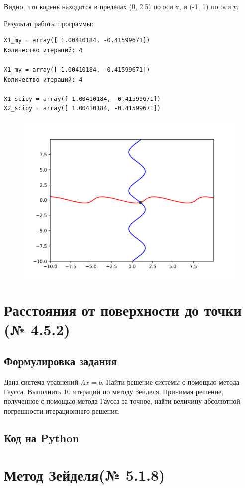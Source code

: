 \documentclass[a4paper,11pt]{article}
\theoremstyle{definition} %
\theoremstyle{remark} %
\begin{document}
Видно, что корень находится в пределах (0, 2.5) по оси x, и (-1, 1)  по оси y.

Результат работы программы:

\begin{verbatim}
X1_my = array([ 1.00410184, -0.41599671])
Количество итераций: 4

X1_my = array([ 1.00410184, -0.41599671])
Количество итераций: 4

X1_scipy = array([ 1.00410184, -0.41599671])
X2_scipy = array([ 1.00410184, -0.41599671])
\end{verbatim}

\begin{figure}[h]
    \includegraphics[width=0.49\linewidth]{../nonlinear_newton_with_point}
\end{figure}


\section{Расстояния от поверхности до точки (№ 4.5.2)}

\subsection{Формулировка задания}

Дана система уравнений $A x = b$. Найти решение системы с помощью метода Гаусса. Выполнить 10 итераций по методу Зейделя. Принимая решение, полученное с помощью метода Гаусса за точное, найти величину абсолютной погрешности итерационного решения.

\subsection{Код на Python}

\section{Метод Зейделя(№ 5.1.8)}
\end{document}

